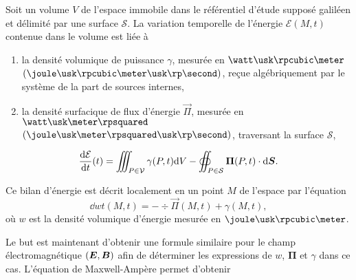 \begin{defn}
	Soit un volume $V$ de l'espace immobile 
	dans le référentiel d'étude supposé
	galiléen et délimité par une surface $\mathcal{S}$. La variation 
	temporelle de l'énergie $\mathcal{E}(M, t)$
	contenue dans le volume est liée à
	\begin{enumerate}
	\item la densité volumique de puissance
	$\gamma$, mesurée en $\watt \usk \rpcubic \meter$ 
	  $(\joule \usk \rpcubic \meter \usk \rp \second)$, 
	  reçue algébriquement par le système de la part de sources internes,
	
  	\item la densité surfacique de flux d'énergie $\vec{\Pi}$,
	  mesurée en $\watt \usk \meter \rpsquared$ 
	  $(\joule \usk \meter \rpsquared \usk \rp \second)$,
	  traversant la surface $\mathcal{S}$,
	\end{enumerate}
	
	\begin{equation}
		\dn{\mathcal{E}}{t}(t) = \iiint_{P \in \mathcal{V}} \gamma(P, t) \dV
		- \oiint_{P \in \mathcal{S}} \vec{\Pi}(P, t) \cdot \ds.
	\end{equation}

	Ce bilan d'énergie est décrit localement en un point $M$ de l'espace
	par l'équation
	\begin{equation}
		\dd{w}{t}(M, t) = -\div \vec{\Pi}(M, t) + \gamma(M, t),
	\end{equation}
	où $w$ est la densité volumique d'énergie 
	mesurée en $\joule \usk \rpcubic \meter$.
\end{defn}

Le but est maintenant d'obtenir une formule similaire pour le champ électromagnétique
$(\vece, \vecb)$ afin de déterminer les expressions de
$w$, $\mathbf{\Pi}$ et $\gamma$ dans ce cas. L'équation de Maxwell-Ampère 
permet d'obtenir

